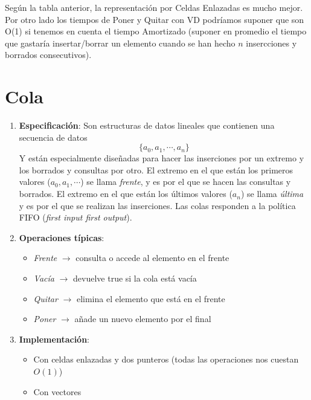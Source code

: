 \documentclass[10pt,a4paper,spanish]{report}
\begin{document}
\noindent
Según la tabla anterior, la representación por Celdas Enlazadas es mucho mejor. Por otro lado
los tiempos de Poner y Quitar con VD podríamos suponer que son O(1) si tenemos en cuenta el tiempo
Amortizado (suponer en promedio el tiempo que gastaría insertar/borrar un elemento cuando se han
hecho $n$ insercciones y borrados consecutivos).

\section{\textcolor[rgb]{0.2,0.5,0.5}Cola}
\noindent
\begin{enumerate}[$\spadesuit$]
\item \textbf{\textcolor[rgb]{0.2,0.5,0.5}{Especificación}}: Son estructuras de datos lineales que contienen una secuencia de datos
\begin{displaymath}
    \{a_{0},a_{1},\cdots,a_{n}\}
\end{displaymath}
Y están especialmente diseñadas para hacer las inserciones por un extremo y los borrados
y consultas por otro. El extremo en el que están los primeros valores ($a_{0},a_{1},\cdots$)
se llama \textit{\textcolor[rgb]{0.2,0.5,0.5}{frente}}, y es por el que se hacen
las consultas y borrados. El extremo en el que están los últimos valores ($a_{n}$)
se llama \textit{\textcolor[rgb]{0.2,0.5,0.5}{última}} y es por el que se realizan las inserciones.
Las colas responden a la política FIFO (\textit{\textcolor[rgb]{0.2,0.5,0.5}{first input first output}}).

\item \textbf{\textcolor[rgb]{0.2,0.5,0.5}{Operaciones típicas}}:
\begin{itemize}
    \item \textit{\textcolor[rgb]{0.2,0.5,0.5}{Frente}} $\longrightarrow$ consulta o accede al elemento en el frente
    \item \textit{\textcolor[rgb]{0.2,0.5,0.5}{Vacía}} $\longrightarrow$ devuelve true si la cola está vacía
    \item \textit{\textcolor[rgb]{0.2,0.5,0.5}{Quitar}} $\longrightarrow$ elimina el elemento que está en el frente
    \item \textit{\textcolor[rgb]{0.2,0.5,0.5}{Poner}} $\longrightarrow$ añade un nuevo elemento por el final
\end{itemize}

\item \textbf{\textcolor[rgb]{0.2,0.5,0.5}{Implementación}}:
\begin{itemize}
    \item Con celdas enlazadas y dos punteros (todas las operaciones nos cuestan $O(1)$)
    \item Con vectores
\end{itemize}
\end{enumerate}
\end{document}
